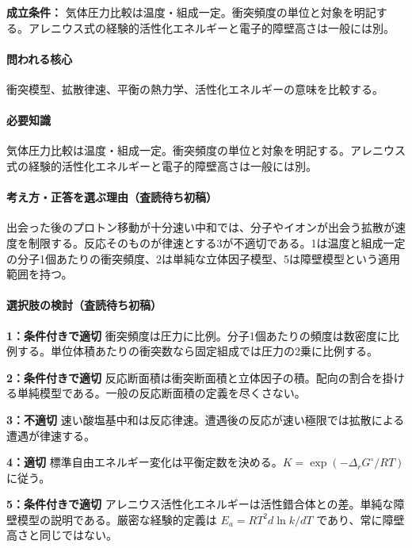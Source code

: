 \noindent\textbf{成立条件：} 気体圧力比較は温度・組成一定。衝突頻度の単位と対象を明記する。アレニウス式の経験的活性化エネルギーと電子的障壁高さは一般には別。\par

\paragraph{問われる核心} 衝突模型、拡散律速、平衡の熱力学、活性化エネルギーの意味を比較する。

\paragraph{必要知識} 気体圧力比較は温度・組成一定。衝突頻度の単位と対象を明記する。アレニウス式の経験的活性化エネルギーと電子的障壁高さは一般には別。

\paragraph{考え方・正答を選ぶ理由（査読待ち初稿）} 出会った後のプロトン移動が十分速い中和では、分子やイオンが出会う拡散が速度を制限する。反応そのものが律速とする3が不適切である。1は温度と組成一定の分子1個あたりの衝突頻度、2は単純な立体因子模型、5は障壁模型という適用範囲を持つ。

\paragraph{選択肢の検討（査読待ち初稿）}\mbox{}\par

\noindent\textbf{1：条件付きで適切} 衝突頻度は圧力に比例。分子1個あたりの頻度は数密度に比例する。単位体積あたりの衝突数なら固定組成では圧力の2乗に比例する。\par

\noindent\textbf{2：条件付きで適切} 反応断面積は衝突断面積と立体因子の積。配向の割合を掛ける単純模型である。一般の反応断面積の定義を尽くさない。\par

\noindent\textbf{3：不適切} 速い酸塩基中和は反応律速。遭遇後の反応が速い極限では拡散による遭遇が律速する。\par

\noindent\textbf{4：適切} 標準自由エネルギー変化は平衡定数を決める。\(K=\exp(-\Delta_rG^\circ/RT)\) に従う。\par

\noindent\textbf{5：条件付きで適切} アレニウス活性化エネルギーは活性錯合体との差。単純な障壁模型の説明である。厳密な経験的定義は \(E_a=RT^2d\ln k/dT\) であり、常に障壁高さと同じではない。\par

